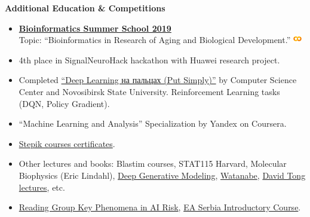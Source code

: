 \documentclass[12pt]{article}
\begin{document}
\noindent \textbf{\Large Additional Education \& Competitions}
\begin{itemize}
    \item \href{https://bioinf.me/education/summer/2019}{\textbf{Bioinformatics Summer School 2019}} \\
          Topic: “Bioinformatics in Research of Aging and Biological Development.” \href{https://docs.google.com/presentation/d/12X9N3eo9C5_c6ys-fudM9NPqtLNOq7waT3EI_VHpk_8/edit?usp=sharing}{\faChalkboardTeacher} \href{https://colab.research.google.com/drive/1oeGpQUsOl7thfNZp0QWXT5PVvh8-RbF8?usp=sharing}{\includegraphics[height=1em]{google-colab-logo.png}}

    \item 4th place in SignalNeuroHack hackathon with Huawei research project. \href{https://github.com/eluator/SignalNeuroHackTasks}{\faGithub}
    \item Completed \href{https://dlcourse.ai}{“Deep Learning на пальцах (Put Simply)”} by Computer Science Center and Novosibirsk State University. \href{https://github.com/eluator/dlcourse_ai}{\faGithub} Reinforcement Learning tasks (DQN, Policy Gradient).  \href{https://github.com/eluator/JetBrainsInternship}{\faGithub}
    \item “Machine Learning and Analysis” Specialization by Yandex on Coursera. \href{https://github.com/eluator/Coursera_ML}{\faGithub}
    \item \href{https://stepik.org/users/19741243/certificates}{Stepik courses certificates}.
    \item Other lectures and books: Blastim courses, STAT115 Harvard, Molecular Biophysics (Eric Lindahl), \href{https://link.springer.com/book/10.1007/978-3-030-93158-2}{Deep Generative Modeling}, \href{https://www.amazon.com/Algebraic-Statistical-Monographs-Computational-Mathematics/dp/0521864674/ref=sr_1_1?dib=eyJ2IjoiMSJ9.tkLNU_LnXzjo49nLudxBHTXgdSUji9_CDh8zIkf9eCNvsNrFQaIWdoEvn0XHpA2RrMEOWYmMgClofNKBNuugcUyAIhpemShvdfqTQcb8C1dGB0gnYam5WTp_IljQ1qbXZ4_4eejJPBanxVeKXy7XRvZ0QZG5AfHUOfc_w4rJE4_mrQYTHFq40KvTw2OobJbxZwgS0VQ9FOR-hBol-1ol7-zVnsjPFafUT9knUSpWxyI.fIl8H9UcscDCXG7cs5jBfaYT9ZVPPOnZacK73pkM0G4&dib_tag=se&qid=1735428125&refinements=p_27%3ASumio+Watanabe&s=books&sr=1-1}{Watanabe}, \href{https://www.damtp.cam.ac.uk/user/tong/teaching.html}{David Tong lectures}, etc.
    \item \href{https://www.alignmentforum.org/posts/vakhhNHduW9gmENTW/announcing-new-round-of-key-phenomena-in-ai-risk-reading}{Reading Group Key Phenomena in AI Risk}, 
          \href{https://www.linkedin.com/posts/effective-altruism-serbia_easerbia-makedifference-effectivealtruism-activity-7046076217321566208-SMq2/}{EA Serbia Introductory Course}.
\end{itemize}
\end{document}
